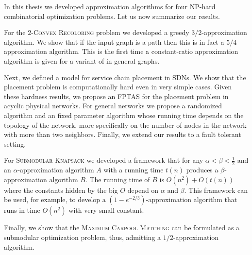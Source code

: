 In this thesis we developed approximation algorithms for four NP-hard combinatorial optimization problems. 
Let us now summarize our results.

For the \textsc{2-Convex Recoloring} problem we developed a greedy $3/2$-approximation algorithm.
We show that if the input graph is a path then this is in fact a $5/4$-approximation algorithm.
This is the first time a constant-ratio approximation algorithm is
given for a variant of
\CRP{} in general graphs.

Next, we defined a model for service chain placement in SDNs.
We show that the placement problem is computationally hard even in very simple cases.  Given these hardness results, we propose an FPTAS for the placement problem in acyclic physical networks.  
For general networks we propose a randomized algorithm and an fixed parameter algorithm whose running time depends on the topology of the network, more specifically on the number of nodes in the network with more than two neighbors.  
Finally, we extend our results to a fault tolerant setting.

For \textsc{Submodular Knapsack} we developed a framework that for any $\alpha < \beta < \frac{1}{2}$ and an $\alpha$-approximation algorithm $A$ with a running time $t(n)$ produces a $\beta$-approximation algorithm $B$.
The running time of $B$ is $O(n^2) + O(t(n))$ where the constants hidden by the big $O$ depend on $\alpha$ and $\beta$.
This framework can be used, for example, to develop a $(1-e^{-2/3})$-approximation algorithm that runs in time $O(n^2)$ with very small constant.

Finally, we show that the \textsc{Maximum Carpool Matching} can be formulated as a submodular optimization problem, thus, admitting a $1/2$-approximation algorithm.
